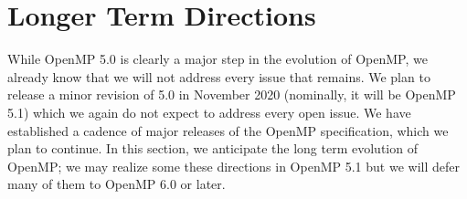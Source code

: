 \section{Longer Term Directions}
\label{sec:future_directions}

While OpenMP 5.0 is clearly a major step in the evolution of OpenMP,
we already know that we will not address every issue that remains.
We plan to release a minor revision of 5.0 in November 2020 (nominally,
it will be OpenMP 5.1) which we again do not expect to address every
open issue. We have established a cadence of major releases of the
OpenMP specification, which we plan to continue. In this section, we 
anticipate the long term evolution of OpenMP; we may realize some these 
directions in OpenMP 5.1 but we will defer many of them to OpenMP 6.0 
or later. 









